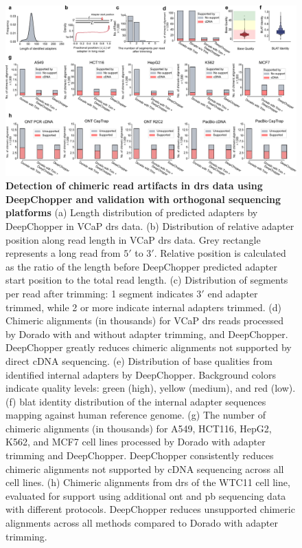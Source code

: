 \documentclass[pdflatex,sn-nature, lineno]{sn-jnl}%
\begin{document}
\begin{figure}[!ht]
    \includegraphics[height=0.6\columnwidth]{finals/figure2}
    \caption{{\bf Detection of chimeric read artifacts in \gls{drs} data using DeepChopper and validation with orthogonal sequencing platforms}  (a) Length distribution of predicted adapters by DeepChopper in VCaP \gls{drs} data. (b) Distribution of relative adapter position along read length in VCaP \gls{drs} data. Grey rectangle represents a long read from $5'$ to $3'$. Relative position is calculated as the ratio of the length before DeepChopper predicted adapter start position to the total read length. (c) Distribution of segments per read after trimming: 1 segment indicates $3'$ end adapter trimmed, while 2 or more indicate internal adapters trimmed. (d) Chimeric alignments (in thousands) for VCaP \gls{drs} reads processed by Dorado with and without adapter trimming, and DeepChopper. DeepChopper greatly reduces chimeric alignments not supported by direct cDNA sequencing. (e) Distribution of base qualities from identified internal adapters by DeepChopper. Background colors indicate quality levels: green (high), yellow (medium), and red (low). (f) \gls{blat} identity distribution of the internal adapter sequences mapping against human reference genome. (g) The number of chimeric alignments (in thousands) for A549, HCT116, HepG2, K562, and MCF7 cell lines processed by Dorado with adapter trimming and DeepChopper. DeepChopper consistently reduces chimeric alignments not supported by cDNA sequencing across all cell lines. (h) Chimeric alignments from \gls{drs} of the WTC11 cell line, evaluated for support using additional \gls{ont} and \gls{pb} sequencing data with different protocols. DeepChopper reduces unsupported chimeric alignments across all methods compared to Dorado with adapter trimming.}\label{fig:f2}
\end{figure}
\end{document}

